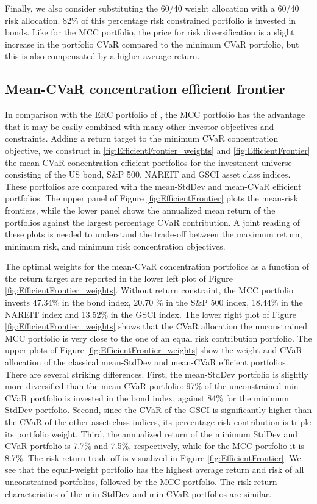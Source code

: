 \documentclass[12pt,a4paper]{article}
\begin{document}
Finally, we also consider substituting the 60/40 weight allocation with a 60/40 risk allocation.  82\% of this percentage risk constrained portfolio is invested in bonds. Like for the MCC portfolio, the price for risk diversification is a slight increase in the portfolio CVaR compared to the minimum CVaR portfolio, but this is also compensated by a higher average return.


\subsection{Mean-CVaR concentration efficient frontier}\label{subsec:efficientfrontiers}


In comparison with the ERC portfolio of \citet{Qian2005}, the MCC portfolio has the advantage that it may be easily combined with many other investor objectives and constraints. Adding a return target to the minimum CVaR concentration objective, we construct in  \ref{fig:EfficientFrontier_weights}  and \ref{fig:EfficientFrontier}  the mean-CVaR concentration efficient portfolios for the investment universe consisting of the US bond, S\&P 500, NAREIT and GSCI asset class indices. These portfolios are compared with the mean-StdDev and mean-CVaR efficient portfolios. The upper panel of Figure \ref{fig:EfficientFrontier} plots the mean-risk frontiers, while the lower panel shows the annualized mean return of the portfolios against the largest percentage CVaR contribution. A joint reading of these plots is needed to understand the trade-off between the maximum return, minimum risk, and minimum risk concentration objectives. 

The optimal weights for the mean-CVaR concentration portfolios as a function of the return target are reported in the lower left plot of Figure \ref{fig:EfficientFrontier_weights}. Without return constraint, the MCC portfolio invests 47.34\% in the bond index, 20.70 \% in the S\&P 500 index, 18.44\% in the NAREIT index and 13.52\% in the GSCI index. The lower right plot of Figure \ref{fig:EfficientFrontier_weights} shows that the CVaR allocation the unconstrained MCC portfolio is very close to the one of an equal risk contribution portfolio. The upper plots of Figure \ref{fig:EfficientFrontier_weights} show the weight and CVaR allocation of the classical mean-StdDev and mean-CVaR efficient portfolios. There are several striking differences. First, the mean-StdDev portfolio is slightly more diversified than the mean-CVaR portfolio: 97\% of the unconstrained min CVaR portfolio is invested in the bond index, against 84\% for the minimum StdDev portfolio. Second, since the CVaR of the GSCI is significantly higher than the CVaR of the other asset class indices, its percentage risk contribution is triple its portfolio weight. 
Third, the annualized return of the minimum StdDev and CVaR portfolio is 7.7\% and 7.5\%, respectively, while for the MCC portfolio it is 8.7\%.
The risk-return trade-off is visualized in Figure \ref{fig:EfficientFrontier}. We see that the equal-weight portfolio has the highest average return and risk of all unconstrained portfolios, followed by the MCC portfolio. The risk-return characteristics of the min StdDev and min CVaR portfolios are similar.
\end{document}
